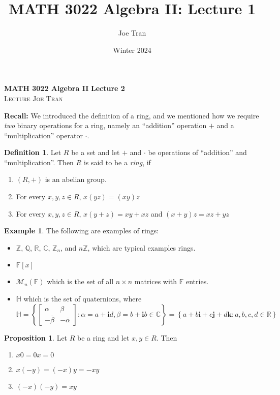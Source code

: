\documentclass[11pt]{amsart}
\title{MATH 3022 Algebra II: Lecture 1}
\author{Joe Tran}
\date{Winter 2024}
\theoremstyle{definition}\newtheorem{definition}{Definition}
\theoremstyle{definition}\newtheorem{example}{Example}
\theoremstyle{theorem}\newtheorem{theorem}{Theorem}
\theoremstyle{theorem}\newtheorem{corollary}{Corollary}
\theoremstyle{theorem}\newtheorem{proposition}{Proposition}
\theoremstyle{theorem}\newtheorem{lemma}{Lemma}
\theoremstyle{theorem}\newtheorem{question}{Question}
\theoremstyle{remark}\newtheorem{remark}{Remark}
\newcommand{\C}{\mathbb{C}}
\newcommand{\R}{\mathbb{R}}
\newcommand{\Q}{\mathbb{Q}}
\newcommand{\Z}{\mathbb{Z}}
\newcommand{\F}{\mathbb{F}}
\newcommand{\M}{\mathcal{M}}
\renewcommand{\H}{\mathbb{H}}
\begin{document}
\textbf{MATH 3022 Algebra II} \hfill \textbf{Lecture 2} \\
\textsc{Lecture} \hfill \textsc{Joe Tran}

\textbf{Recall:} We introduced the definition of a ring, and we mentioned how we require \emph{two} binary operations for a ring, namely an ``addition'' operation $+$ and a ``multiplication'' operator $\cdot$.

\begin{definition}\label{definition:1}
    Let $R$ be a set and let $+$ and $\cdot$ be operations of ``addition'' and ``multiplication''. Then $R$ is said to be a \emph{ring}, if
    \begin{enumerate}
        \item $(R, +)$ is an abelian group.
        \item For every $x, y, z \in R$, $x(yz) = (xy)z$
        \item For every $x, y, z \in R$, $x(y + z) = xy + xz$ and $(x + y)z = xz + yz$
    \end{enumerate}
\end{definition}

\begin{example}\label{example:1}
    The following are examples of rings:
    \begin{itemize}
        \item $\Z$, $\Q$, $\R$, $\C$, $\Z_n$, and $n\Z$, which are typical examples rings.
        \item $\F[x]$
        \item $\M_n(\F)$ which is the set of all $n \times n$ matrices with $\F$ entries.
        \item $\H$ which is the set of quaternions, where
        \begin{equation*}
            \H = \left\{\begin{bmatrix} \alpha & \beta \\ -\overline{\beta} & -\overline{\alpha} \end{bmatrix} : \alpha = a + \mathbf{i}d, \beta = b + \mathbf{i}b \in \C\right\} = \left\{a + b\mathbf{i} + c\mathbf{j} + d\mathbf{k} : a, b, c, d \in \R\right\}
        \end{equation*}
    \end{itemize}
\end{example}

\begin{proposition}\label{proposition:1}
    Let $R$ be a ring and let $x, y \in R$. Then
    \begin{enumerate}
        \item $x0 = 0x = 0$
        \item $x(-y) = (-x)y = -xy$
        \item $(-x)(-y) = xy$
    \end{enumerate}
\end{proposition}
\end{document}
